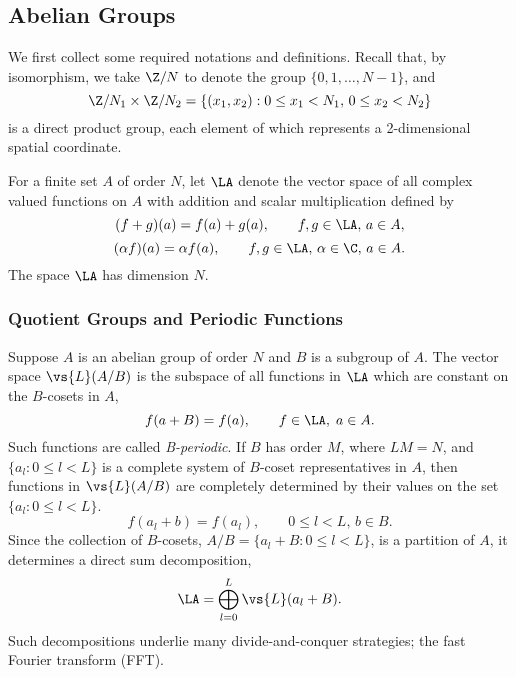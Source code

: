 \subsection{Abelian Groups}
We first collect some required notations and definitions.
Recall that, by isomorphism, we take $\Z/N$ to denote the group
$\{0,1,\ldots,N-1\}$, and
\[
\Z/N_1 \times \Z/N_2 = \{(x_1, x_2) : 0 \leq x_1 < N_1, \, 0 \leq x_2 < N_2 \}
\]
is a direct product group, each element of which represents a 2-dimensional
spatial coordinate. 

For a finite set $A$ of order $N$, let $\LA$ denote the vector space of all
complex valued functions on $A$ with addition and scalar multiplication
defined by 
\[
(f+g)(a) = f(a)+g(a), \qquad f, g \in \LA,\, a\in A,
\]
\[
(\alpha f)(a) = \alpha f(a), \qquad f, g \in \LA, \, \alpha \in \C, \, a\in A.
\]
The space $\LA$ has dimension $N$.

\subsubsection{Quotient Groups and Periodic Functions}
Suppose $A$ is an abelian group of order $N$ and $B$ is a
subgroup of $A$.  The vector space $\vs{L}(A/B)$ is the
subspace of all functions in $\LA$ which are constant on the
$B$-cosets in $A$, 
\[
f(a+B) = f(a), \qquad f\in \LA, \; a\in A.
\]
Such functions are called \emph{B-periodic}. 
If $B$ has order $M$, where $LM = N$, and 
$\{a_l : 0 \leq l < L\}$ is a complete system of
$B$-coset representatives in $A$, then functions in
$\vs{L}(A/B)$ are completely determined by their values on
the set $\{a_l : 0 \leq l < L\}$.  
\[
f(a_l + b) = f(a_l), \qquad 0 \leq l < L, \, b\in B.
\]
Since the collection of $B$-cosets, 
$A/B =\{a_l +B : 0 \leq l < L\}$, 
is a partition of $A$, it determines a direct sum
decomposition,
\[
\LA = \bigoplus_{l = 0}^L \vs{L}(a_l + B).
\]
Such decompositions underlie many divide-and-conquer
strategies; \eg the fast Fourier transform (FFT).

